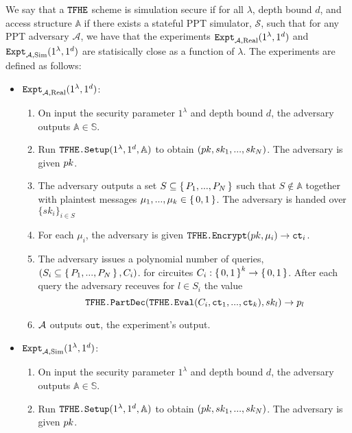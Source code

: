 \begin{definition}
	We say that a ${\texttt{TFHE}}$ scheme is simulation secure if for all $\lambda$, depth bound $d$, and access structure $\mathbb{A}$
	if there exists a stateful PPT simulator, $\mathcal{S}$, such that for any PPT adversary $\mathcal{A}$,
	we have that the experiments $\texttt{Expt}_{\mathcal{A}, \text{Real}}(1^\lambda, 1^d)$ and $\texttt{Expt}_{\mathcal{A}, \text{Sim}}(1^\lambda, 1^d)$ are statisically close
	as a function of $\lambda$. The experiments are defined as follows:

	\begin{itemize}
		\item
		      $\texttt{Expt}_{\mathcal{A}, \text{Real}}(1^\lambda, 1^d)$: \begin{enumerate}
			      \item On input the security parameter $1^\lambda$ and depth bound $d$, the adversary outputs $\mathbb{A} \in \mathbb{S}$.
			      \item Run $\texttt{TFHE.Setup}(1^\lambda, 1^d, \mathbb{A})$ to obtain $(pk, sk_1, ..., sk_N)$.
						The adversary is given $pk$.
						\item The adversary outputs a set $S \subseteq \set{P_1, ..., P_N}$ such that $S \notin \mathbb{A}$
						together with plaintest messages $\mu_1, ..., \mu_k \in \set{0, 1}$. The adversary is handed over $\{sk_i\}_{i \in S}$
						\item For each $\mu_i$, the adversary is given $\texttt{TFHE.Encrypt}(pk, \mu_i) \rightarrow \texttt{ct}_i$.
						\item The adversary issues a polynomial number of queries, $(S_i \subseteq \set{P_1, ..., P_N}, C_i)$.
						for circuites $C_i: \set{0, 1}^k \rightarrow \set{0, 1}$. After each query the adversary receuves for $l \in S_i$ the value
						$$
						\texttt{TFHE.PartDec}(\texttt{TFHE.Eval}(C_i, \texttt{ct}_1, ..., \texttt{ct}_k), sk_l) \rightarrow p_l
						$$
						\item $\mathcal{A}$ outputs $\texttt{out}$, the experiment's output.
		      \end{enumerate}
		\item
		      $\texttt{Expt}_{\mathcal{A}, \text{Sim}}(1^\lambda, 1^d)$: \begin{enumerate}
			      \item On input the security parameter $1^\lambda$ and depth bound $d$, the adversary outputs $\mathbb{A} \in \mathbb{S}$.
			      \item Run $\texttt{TFHE.Setup}(1^\lambda, 1^d, \mathbb{A})$ to obtain $(pk, sk_1, ..., sk_N)$.
						The adversary is given $pk$.

\end{enumerate}
\end{itemize}
\end{definition}
